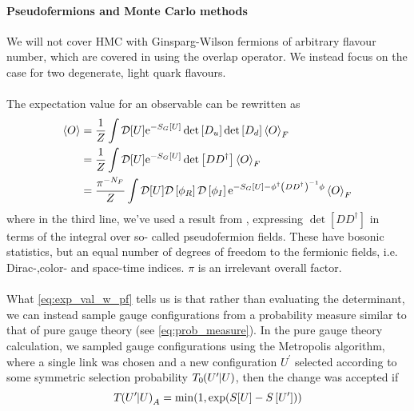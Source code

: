 \documentclass[a4paper,10pt]{article}
\begin{document}
\paragraph{Pseudofermions and Monte Carlo methods}
We will not cover HMC with Ginsparg-Wilson fermions of arbitrary flavour number, which are covered in \cite{DeGrand:2006ws} using the overlap operator. We instead focus on the case for two degenerate, light quark flavours.\\\\ The expectation value for an observable can be rewritten as
\begin{equation}\label{eq:exp_val_w_pf}
\begin{aligned} 
\braket{O}&=\frac{1}{Z} \int \mathcal{D}[U] \mathrm{e}^{-S_{G}[U]} \operatorname{det}\left[D_{u}\right] \operatorname{det}\left[D_{d}\right] \braket{O}_{F}\\&=\frac{1}{Z} \int \mathcal{D}[U] \mathrm{e}^{-S_{G}[U]} \operatorname{det}\left[DD^\dagger\right]\braket{O}_{F}\\&=\frac{\pi^{-N_F}}{Z} \int \mathcal{D}[U]\mathcal{D}\left[\phi_{R}\right] \mathcal{D}\left[\phi_{I}\right] \mathrm{e}^{-S_{G}[U]-\phi^{\dagger}\left(D D^{\dagger}\right)^{-1} \phi}  \braket{O}_{F}
\end{aligned}
\end{equation}
where in the third line, we've used a result from \cite{WeingartenD.H1981MCif}, expressing $\operatorname{det}\left[DD^\dagger\right]$ in terms of the integral over so- called pseudofermion fields. These have bosonic statistics, but an equal number of degrees of freedom to the fermionic fields, i.e. Dirac-,color- and space-time indices. $\pi$ is an irrelevant overall factor.\\\\What \eqref{eq:exp_val_w_pf} tells us is that rather than evaluating the determinant, we can instead sample gauge configurations from a probability measure similar to that of pure gauge theory (see \eqref{eq:prob_measure}). In the pure gauge theory calculation, we sampled gauge configurations using the Metropolis algorithm, where a single link was chosen and a new configuration $U^\prime$ selected according to some symmetric selection probability $T_0\mkern-4mu\left(U^{\prime}\mkern-6mu \mid\mkern-5mu U\right)$, then the change was accepted if
\begin{equation}
T\mkern-4mu\left(U^{\prime}\mkern-6mu \mid\mkern-5mu U\right)_A = \min (1, \exp (S[U]-S\left[U^{\prime}\right]))
\end{equation}
\end{document}
